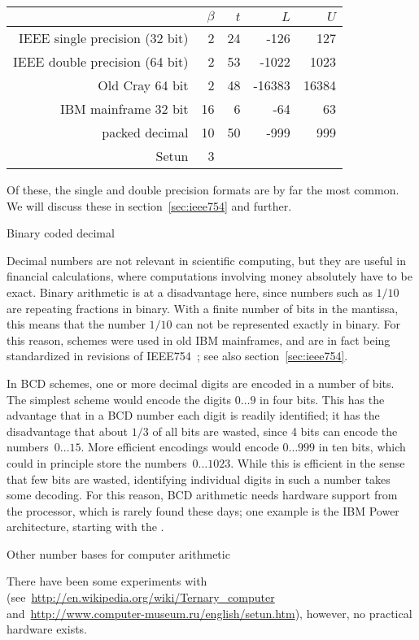 \begin{tabular}{r|r|r|r|r}
  &$\beta$&$t$&$L$&$U$\\ \hline
  IEEE single precision (32 bit)&2&24&-126&127\\
  IEEE double precision (64 bit)&2&53&-1022&1023\\
  Old Cray 64 bit&2&48&-16383&16384\\
  IBM mainframe 32 bit&16&6&-64&63\\
  packed decimal&10&50&-999&999\\
  Setun&3
\end{tabular}

Of these, the single and double precision formats are by far the most
common. We will discuss these in section~\ref{sec:ieee754} and
further.

 {Binary coded decimal}
\label{sec:bcd}

Decimal numbers are not relevant in scientific computing, but they are
useful in financial calculations, where computations involving money
absolutely have to be exact. Binary arithmetic is at a disadvantage
here, since numbers such as $1/10$ are repeating fractions in
binary. With a finite number of bits in the mantissa,
this means that the number $1/10$ can not be represented exactly in
binary.  For this reason,  schemes
were used in old IBM mainframes, and are in fact being
standardized in revisions of IEEE754~\cite{ieee754-webpage}; see also
section~\ref{sec:ieee754}.

In BCD schemes, one or more decimal digits are encoded in a number of
bits. The simplest scheme would encode the digits $0\ldots9$ in four
bits. This has the advantage that in a
BCD number each digit is readily identified; it has the disadvantage
that about $1/3$ of all bits are wasted, since 4 bits can
encode the numbers~$0\ldots15$.
%
More efficient encodings would encode $0\ldots999$ in ten bits, which
could in principle store the numbers~$0\ldots1023$. While this is
efficient in the sense that few bits are wasted, identifying
individual digits in such a number takes some decoding. For this
reason, BCD arithmetic needs hardware support from the processor,
which is rarely found these days; one example is the IBM
Power architecture, starting with the .

 {Other number bases for computer arithmetic}

There have been some experiments with 
(see~\url{http://en.wikipedia.org/wiki/Ternary_computer}
and~\url{http://www.computer-museum.ru/english/setun.htm}), however,
no practical hardware exists.

